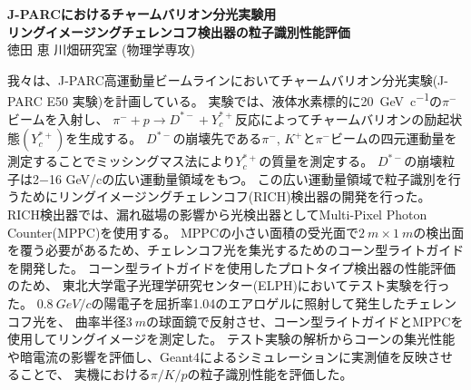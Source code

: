 \documentclass[a5paper,landscape]{jsarticle}
\begin{document}
\thispagestyle{empty}
\begin{center}
  {\textbf{\large{J-PARCにおけるチャームバリオン分光実験用\\リングイメージングチェレンコフ検出器の粒子識別性能評価}}}
  \\
  {徳田 恵 川畑研究室 (物理学専攻)}
\end{center}
我々は、J-PARC高運動量ビームラインにおいてチャームバリオン分光実験(J-PARC E50 実験)を計画している。
実験では、液体水素標的に\SI{20}{\GeV\per c}の$\pi^{-}$ビームを入射し、
$\pi^{-} + p \rightarrow D^{*-} + Y_c^{*+}$反応によってチャームバリオンの励起状態$(Y_c^{*+})$を生成する。
$D^{*-}$の崩壊先である$\pi^-$, $K^+$と$\pi^{-}$ビームの四元運動量を測定することでミッシングマス法により$Y_c^{*+}$の質量を測定する。
$D^{*-}$の崩壊粒子は2$-$16 \si{\GeV / c}の広い運動量領域をもつ。
この広い運動量領域で粒子識別を行うためにリングイメージングチェレンコフ(RICH)検出器の開発を行った。\\\indent
RICH検出器では、漏れ磁場の影響から光検出器としてMulti-Pixel Photon Counter(MPPC)を使用する。
MPPCの小さい面積の受光面で$\SI{2}{m}\times\SI{1}{m}$の検出面を覆う必要があるため、チェレンコフ光を集光するためのコーン型ライトガイドを開発した。
コーン型ライトガイドを使用したプロトタイプ検出器の性能評価のため、
東北大学電子光理学研究センター(ELPH)においてテスト実験を行った。
$\SI{0.8}{GeV/c}$の陽電子を屈折率1.04のエアロゲルに照射して発生したチェレンコフ光を、
曲率半径$\SI{3}{m}$の球面鏡で反射させ、コーン型ライトガイドとMPPCを使用してリングイメージを測定した。
テスト実験の解析からコーンの集光性能や暗電流の影響を評価し、Geant4によるシミュレーションに実測値を反映させることで、
実機における$\pi/K/p$の粒子識別性能を評価した。
\end{document}
